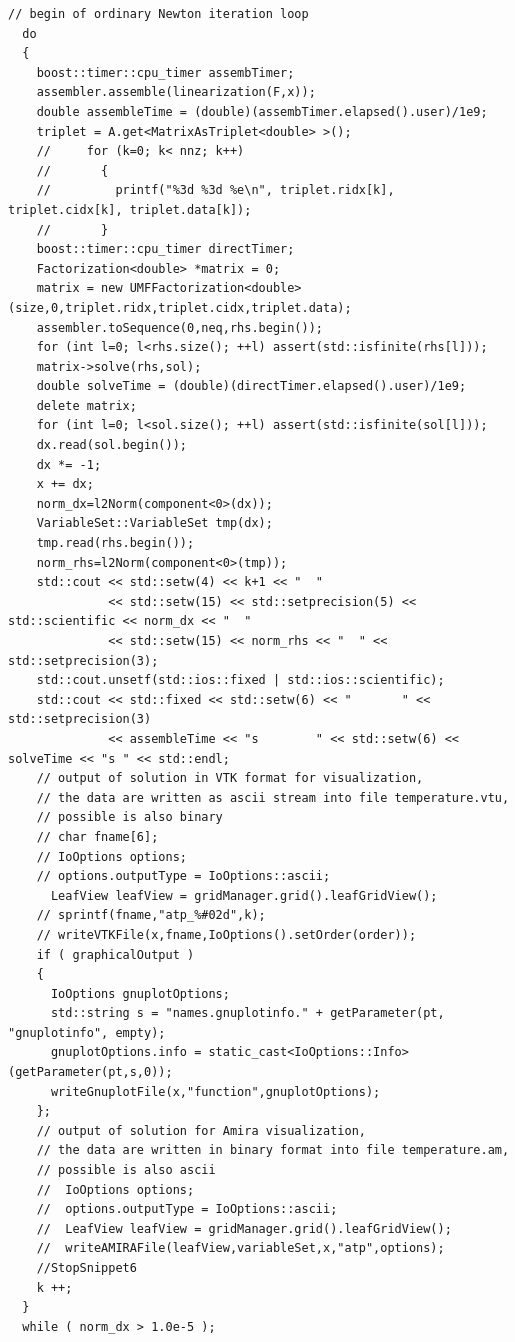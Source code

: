 \documentclass[11pt]{article}
\begin{document}
\begin{lstlisting}
// begin of ordinary Newton iteration loop
  do 
  {
    boost::timer::cpu_timer assembTimer;
    assembler.assemble(linearization(F,x));
    double assembleTime = (double)(assembTimer.elapsed().user)/1e9;
    triplet = A.get<MatrixAsTriplet<double> >();
    //     for (k=0; k< nnz; k++)
    //       {
    //         printf("%3d %3d %e\n", triplet.ridx[k], triplet.cidx[k], triplet.data[k]);
    //       }
    boost::timer::cpu_timer directTimer;
    Factorization<double> *matrix = 0;
    matrix = new UMFFactorization<double>(size,0,triplet.ridx,triplet.cidx,triplet.data);
    assembler.toSequence(0,neq,rhs.begin());
    for (int l=0; l<rhs.size(); ++l) assert(std::isfinite(rhs[l]));
    matrix->solve(rhs,sol);
    double solveTime = (double)(directTimer.elapsed().user)/1e9;
    delete matrix;
    for (int l=0; l<sol.size(); ++l) assert(std::isfinite(sol[l]));
    dx.read(sol.begin());
    dx *= -1;
    x += dx;
    norm_dx=l2Norm(component<0>(dx));
    VariableSet::VariableSet tmp(dx);
    tmp.read(rhs.begin());
    norm_rhs=l2Norm(component<0>(tmp));
    std::cout << std::setw(4) << k+1 << "  " 
              << std::setw(15) << std::setprecision(5) << std::scientific << norm_dx << "  "  
              << std::setw(15) << norm_rhs << "  " << std::setprecision(3);
    std::cout.unsetf(std::ios::fixed | std::ios::scientific);
    std::cout << std::fixed << std::setw(6) << "       " << std::setprecision(3)
              << assembleTime << "s        " << std::setw(6) << solveTime << "s " << std::endl;
    // output of solution in VTK format for visualization,
    // the data are written as ascii stream into file temperature.vtu,
    // possible is also binary
    // char fname[6];
    // IoOptions options;
    // options.outputType = IoOptions::ascii;
      LeafView leafView = gridManager.grid().leafGridView();
    // sprintf(fname,"atp_%#02d",k);
    // writeVTKFile(x,fname,IoOptions().setOrder(order));
    if ( graphicalOutput )
    {
      IoOptions gnuplotOptions;
      std::string s = "names.gnuplotinfo." + getParameter(pt, "gnuplotinfo", empty);
      gnuplotOptions.info = static_cast<IoOptions::Info>(getParameter(pt,s,0));
      writeGnuplotFile(x,"function",gnuplotOptions);
    };
    // output of solution for Amira visualization,
    // the data are written in binary format into file temperature.am,
    // possible is also ascii
    //  IoOptions options;
    //  options.outputType = IoOptions::ascii;
    //  LeafView leafView = gridManager.grid().leafGridView();
    //  writeAMIRAFile(leafView,variableSet,x,"atp",options);
    //StopSnippet6
    k ++;
  }
  while ( norm_dx > 1.0e-5 );
\end{lstlisting}
\end{document}

